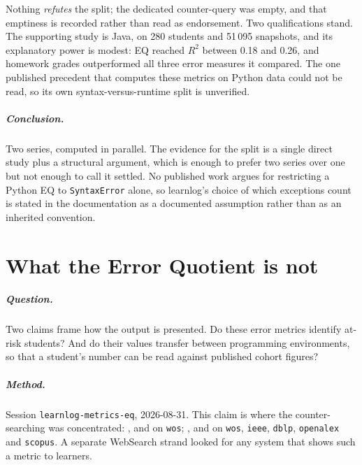 Nothing \emph{refutes} the split; the dedicated counter-query was empty, and
that emptiness is recorded rather than read as endorsement.  Two
qualifications stand.  The supporting study is Java, on 280 students and
51\,095 snapshots, and its explanatory power is modest: EQ reached
\(R^2\) between 0.18 and 0.26, and homework grades outperformed all three
error measures it compared.  The one published precedent that computes these
metrics on Python data \autocite{brocker2024correlation} could not be read,
so its own syntax-versus-runtime split is unverified.

\paragraph{Conclusion.}
Two series, computed in parallel.  The evidence for the split is a single
direct study plus a structural argument, which is enough to prefer two
series over one but not enough to call it settled.  No published work argues
for restricting a Python EQ to \texttt{SyntaxError} alone, so learnlog's
choice of which exceptions count is stated in the documentation as a
documented assumption rather than as an inherited convention.

\chapter{What the Error Quotient is not}
\label{app:claim:eq-not-at-risk}

\paragraph{Question.}
Two claims frame how the output is presented.  Do these error metrics
identify at-risk students?  And do their values transfer between programming
environments, so that a student's number can be read against published
cohort figures?

\paragraph{Method.}
Session \texttt{learnlog-metrics-eq}, 2026-08-31.  This claim is where the
counter-searching was concentrated: ,
 and  on
\texttt{wos}; ,
 and
 on
\texttt{wos}, \texttt{ieee}, \texttt{dblp}, \texttt{openalex} and
\texttt{scopus}.  A separate WebSearch strand looked for any system that
shows such a metric to learners.

